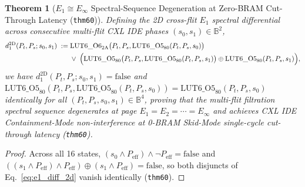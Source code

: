 \documentclass[11pt,letterpaper]{article}
\theoremstyle{spectralthm}
\newtheorem{theorem}{Theorem}[section]
\begin{document}
\begin{theorem}[$E_1 \cong E_\infty$ Spectral-Sequence Degeneration at Zero-BRAM Cut-Through Latency (\texttt{thm60})]
\label{thm:e1_degeneration}
Defining the 2D cross-flit $E_1$ spectral differential across consecutive multi-flit CXL IDE phases $(s_0, s_1) \in \mathbb{B}^2$,
\begin{equation}
\label{eq:e1_diff_2d}
\begin{aligned}
d_1^{\mathrm{2D}}(P_t, P_s; s_0, s_1) \;:=\;& \mathrm{LUT6\_O6}_{2\mathrm{A}}\bigl(P_t, P_s, \mathrm{LUT6\_O5}_{80}(P_t, P_s, s_0)\bigr) \\
&\vee\; \Bigl(\mathrm{LUT6\_O5}_{80}\bigl(P_t, P_s, \mathrm{LUT6\_O5}_{80}(P_t, P_s, s_1)\bigr) \oplus \mathrm{LUT6\_O5}_{80}(P_t, P_s, s_1)\Bigr),
\end{aligned}
\end{equation}
we have $d_1^{\mathrm{2D}}(P_t, P_s; s_0, s_1) = \mathrm{false}$ and $\mathrm{LUT6\_O5}_{80}(P_t, P_s, \mathrm{LUT6\_O5}_{80}(P_t, P_s, s_0)) = \mathrm{LUT6\_O5}_{80}(P_t, P_s, s_0)$ identically for all $(P_t, P_s, s_0, s_1) \in \mathbb{B}^4$, proving that the multi-flit filtration spectral sequence degenerates at page $E_1 = E_2 = \cdots = E_\infty$ and achieves CXL IDE Containment-Mode non-interference at 0-BRAM Skid-Mode single-cycle cut-through latency (\texttt{thm60}).
\end{theorem}
\begin{proof}
Across all 16 states, $(s_0 \wedge P_{\mathrm{eff}}) \wedge \neg P_{\mathrm{eff}} = \mathrm{false}$ and $((s_1 \wedge P_{\mathrm{eff}}) \wedge P_{\mathrm{eff}}) \oplus (s_1 \wedge P_{\mathrm{eff}}) = \mathrm{false}$, so both disjuncts of Eq.~\eqref{eq:e1_diff_2d} vanish identically (\texttt{thm60}).
\end{proof}
\end{document}
